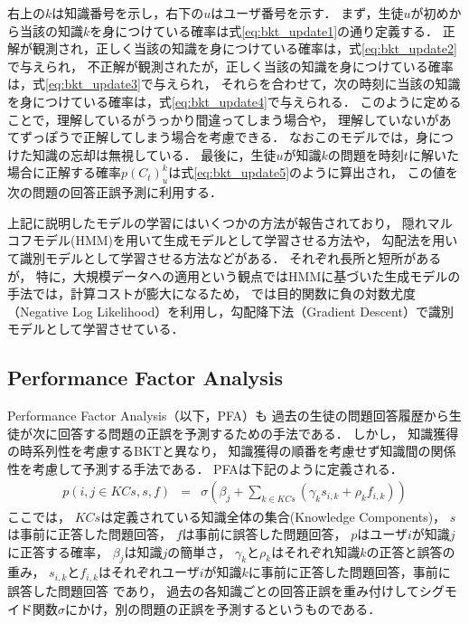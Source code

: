 右上の$k$は知識番号を示し，右下の$u$はユーザ番号を示す．
まず，生徒$u$が初めから当該の知識$k$を身につけている確率は式\ref{eq:bkt_update1}の通り定義する．
正解が観測され，正しく当該の知識を身につけている確率は，式\ref{eq:bkt_update2}で与えられ，
不正解が観測されたが，正しく当該の知識を身につけている確率は，式\ref{eq:bkt_update3}で与えられ，
それらを合わせて，次の時刻に当該の知識を身につけている確率は，式\ref{eq:bkt_update4}で与えられる．
このように定めることで，理解しているがうっかり間違ってしまう場合や， 理解していないがあてずっぽうで正解してしまう場合を考慮できる．
なおこのモデルでは，身につけた知識の忘却は無視している．
最後に，生徒$u$が知識$k$の問題を時刻$t$に解いた場合に正解する確率$p(C_{t})^{k}_{u}$は式\ref{eq:bkt_update5}のように算出され，
この値を次の問題の回答正誤予測に利用する．
 
上記に説明したモデルの学習にはいくつかの方法が報告されており，
隠れマルコフモデル(HMM)を用いて生成モデルとして学習させる方法\cite{corbett1994knowledge}や，
勾配法を用いて識別モデルとして学習させる方法\cite{yudelson2013individualized}などがある．
それぞれ長所と短所があるが，
特に，大規模データへの適用という観点ではHMMに基づいた生成モデルの手法では，計算コストが膨大になるため，
\cite{yudelson2013individualized}では目的関数に負の対数尤度（Negative Log Likelihood）を利用し，勾配降下法（Gradient Descent）で識別モデルとして学習させている．


\subsection{Performance Factor Analysis}
Performance Factor Analysis\cite{pavlik2009performance}（以下，PFA）も
過去の生徒の問題回答履歴から生徒が次に回答する問題の正誤を予測するための手法である．
しかし，
知識獲得の時系列性を考慮するBKTと異なり，
知識獲得の順番を考慮せず知識間の関係性を考慮して予測する手法である．
PFAは下記のように定義される．
\begin{eqnarray}
	p(i, j \in KCs, s, f) & = & \sigma( \beta _j + \sum_{k \in KCs}(\gamma_k s_{i, k} + \rho _k f_{i, k}) )
\end{eqnarray}
ここでは，
$KCs$は定義されている知識全体の集合(Knowledge Components)，
$s$は事前に正答した問題回答，
$f$は事前に誤答した問題回答，
$p$はユーザ$i$が知識$j$に正答する確率，
$\beta_j$は知識$j$の簡単さ，
$\gamma_k$と$\rho_k$はそれぞれ知識$k$の正答と誤答の重み，
$s_{i, k}$と$f_{i, k}$はそれぞれユーザ$i$が知識$k$に事前に正答した問題回答，事前に誤答した問題回答
であり，
過去の各知識ごとの回答正誤を重み付けしてシグモイド関数$\sigma$にかけ，別の問題の正誤を予測するというものである．




